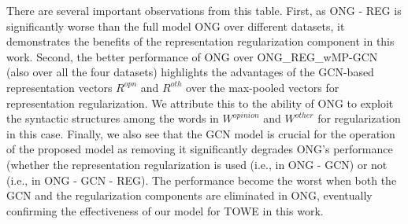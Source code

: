 \documentclass[11pt,a4paper]{article}
\begin{document}
There are several important observations from this table. First, as ONG - REG is significantly worse than the full model ONG over different datasets, it demonstrates the benefits of the representation regularization component in this work. Second, the better performance of ONG over ONG\_REG\_wMP-GCN (also over all the four datasets) highlights the advantages of the GCN-based representation vectors $R^{opn}$ and $R^{oth}$ over the max-pooled vectors for representation regularization. We attribute this to the ability of ONG to exploit the syntactic structures among the words in $W^{opinion}$ and $W^{other}$ for regularization in this case. Finally, we also see that the GCN model is crucial for the operation of the proposed model as removing it significantly degrades ONG's performance (whether the representation regularization is used (i.e., in ONG - GCN) or not (i.e., in ONG - GCN - REG). The performance become the worst when both the GCN and the regularization components are eliminated in ONG, eventually confirming the effectiveness of our model for TOWE in this work.







\begin{table}[t!]
\begin{center}
\end{center}
\caption{\label{tab:reg-Analysis} The performance (i.e., F1 scores) of ONG and ONG\_REG\_wMP-GCN on the four data folds of the development sets for 14res, 14lap, 15res, and 16res. The data folds are based on the target-opinion distances of the examples (called Distance in this table).}
\end{table}
\end{document}
